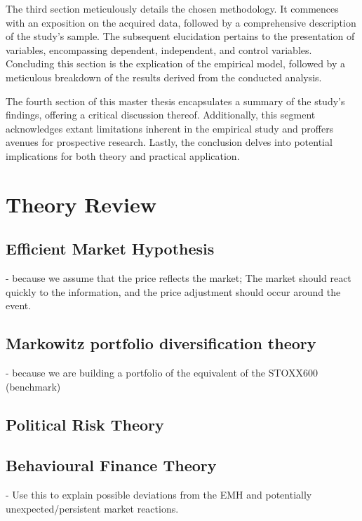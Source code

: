 \documentclass[12pt,a4paper]{article}
\begin{document}
The third section meticulously details the chosen methodology. It commences with an exposition on the acquired data, followed by a comprehensive description of the study's sample. The subsequent elucidation pertains to the presentation of variables, encompassing dependent, independent, and control variables. Concluding this section is the explication of the empirical model, followed by a meticulous breakdown of the results derived from the conducted analysis.

The fourth section of this master thesis encapsulates a summary of the study's findings, offering a critical discussion thereof. Additionally, this segment acknowledges extant limitations inherent in the empirical study and proffers avenues for prospective research. Lastly, the conclusion delves into potential implications for both theory and practical application.






\section{Theory Review}
\subsection{Efficient Market Hypothesis} - because we assume that the price reflects the market; The market should react quickly to the information, and the price adjustment should occur around the event.
\subsection{Markowitz portfolio diversification theory} - because we are building a portfolio of the equivalent of the STOXX600 (benchmark)  
\subsection{Political Risk Theory}
\subsection{Behavioural Finance Theory} - Use this to explain possible deviations from the EMH and potentially unexpected/persistent market reactions.
\end{document}
